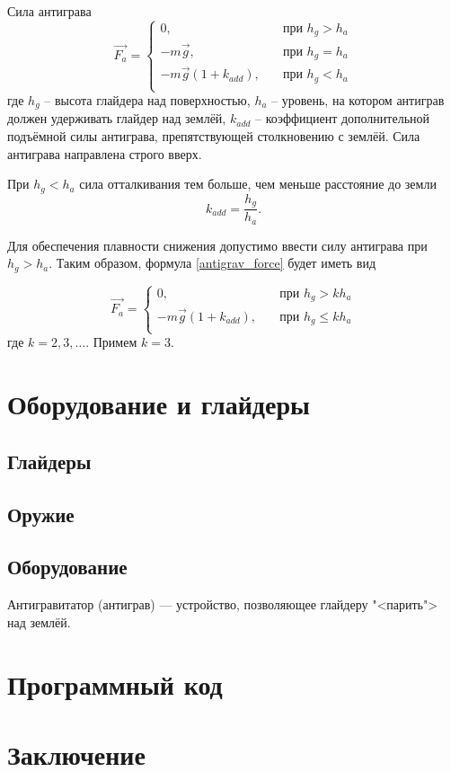 \documentclass[a4paper,12pt]{report}
\begin{document}
Сила антиграва
\begin{equation}
\label{antigrav_force}
\vec{F_a} =
\begin{cases}
0, & \quad \text{при } h_{g} > h_a \\
-m\vec{g}, & \quad \text{при } h_{g} = h_a \\
-m\vec{g}(1+ k_{add}), & \quad \text{при } h_{g} < h_a \\
\end{cases}
\end{equation}
где $h_{g}$ -- высота глайдера над поверхностью, $h_a$ -- уровень, на котором антиграв должен удерживать глайдер над землёй, $k_{add}$ -- коэффициент дополнительной подъёмной силы антиграва, препятствующей столкновению с землёй.
Сила антиграва направлена строго вверх.

При $h_g < h_a$ сила отталкивания тем больше, чем меньше расстояние до земли
\begin{equation}
k_{add} =\frac{h_{g}}{h_{a}}.
\end{equation}

Для обеспечения плавности снижения допустимо ввести силу антиграва при $h_{g} > h_a$. Таким образом, формула \eqref{antigrav_force} будет иметь вид

\begin{equation}
\vec{F_a} =
\begin{cases}
0, & \quad \text{при } h_{g} > k h_a \\
-m\vec{g}(1+ k_{add}), & \quad \text{при } h_{g} \le k h_a \\
\end{cases}
\end{equation}
где $k=2,3,\dots$. Примем $k=3$.

\chapter{Оборудование и глайдеры}
\section{Глайдеры}
\section{Оружие}
\section{Оборудование}

Антигравитатор (антиграв) --- устройство, позволяющее глайдеру "<парить"> над землёй.

\chapter{Программный код}

\chapter*{Заключение}

\end{document}
